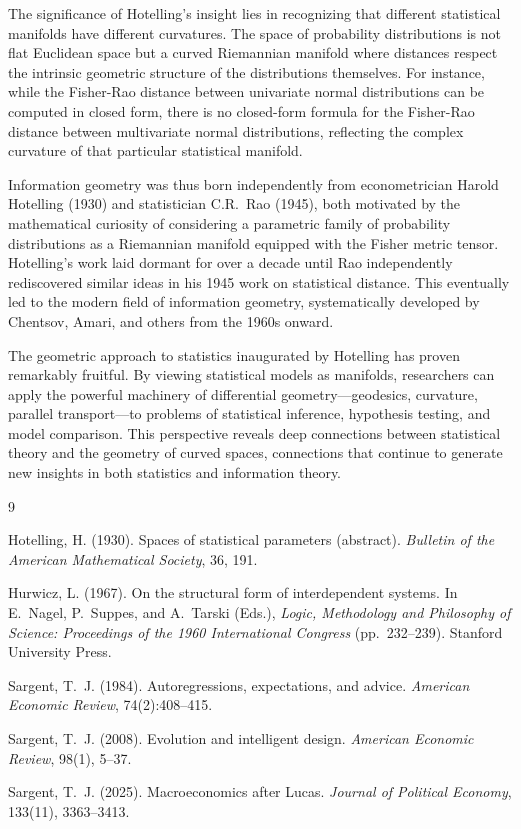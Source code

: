 \documentclass[12pt]{article}
\begin{document}
The significance of Hotelling's insight lies in recognizing that different statistical manifolds have different curvatures. The space of probability distributions is not flat Euclidean space but a curved Riemannian manifold where distances respect the intrinsic geometric structure of the distributions themselves. For instance, while the Fisher-Rao distance between univariate normal distributions can be computed in closed form, there is no closed-form formula for the Fisher-Rao distance between multivariate normal distributions, reflecting the complex curvature of that particular statistical manifold.

Information geometry was thus born independently from econometrician Harold Hotelling (1930) and statistician C.R.\ Rao (1945), both motivated by the mathematical curiosity of considering a parametric family of probability distributions as a Riemannian manifold equipped with the Fisher metric tensor. Hotelling's work laid dormant for over a decade until Rao independently rediscovered similar ideas in his 1945 work on statistical distance. This eventually led to the modern field of information geometry, systematically developed by Chentsov, Amari, and others from the 1960s onward.

The geometric approach to statistics inaugurated by Hotelling has proven remarkably fruitful. By viewing statistical models as manifolds, researchers can apply the powerful machinery of differential geometry---geodesics, curvature, parallel transport---to problems of statistical inference, hypothesis testing, and model comparison. This perspective reveals deep connections between statistical theory and the geometry of curved spaces, connections that continue to generate new insights in both statistics and information theory.

\begin{thebibliography}{9}


Hotelling, H. (1930). Spaces of statistical parameters (abstract). \emph{Bulletin of the American Mathematical Society}, 36, 191.

Hurwicz, L. (1967). On the structural form of interdependent systems. In E.~Nagel, P.~Suppes, and A.~Tarski (Eds.), \emph{Logic, Methodology and Philosophy of Science: Proceedings of the 1960 International Congress} (pp.~232--239). Stanford University Press.


Sargent, T.~J. (1984).
\newblock Autoregressions, expectations, and advice.
\newblock \emph{American Economic Review}, 74(2):408--415.

Sargent, T.~J. (2008). Evolution and intelligent design. \emph{American Economic Review}, 98(1), 5--37.

Sargent, T.~J. (2025). Macroeconomics after Lucas. \emph{Journal of Political Economy}, 133(11), 3363--3413.

\end{thebibliography}
\end{document}
